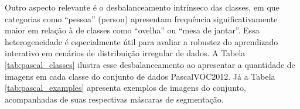 Outro aspecto relevante é o
desbalanceamento intrínseco das classes, em que categorias como ``pessoa'' (person) apresentam frequência significativamente maior em relação à de classes como ``ovelha'' ou ``mesa de jantar''. Essa heterogeneidade é especialmente útil para avaliar a robustez do aprendizado interativo em cenários de distribuição irregular de dados. A Tabela \ref{tab:pascal_classes} ilustra esse desbalanceamento ao apresentar a quantidade de imagens em cada classe do conjunto de dados \ac{PascalVOC2012}. Já a Tabela \ref{tab:pascal_examples} apresenta exemplos de imagens do conjunto, acompanhadas de suas respectivas máscaras de segmentação.




